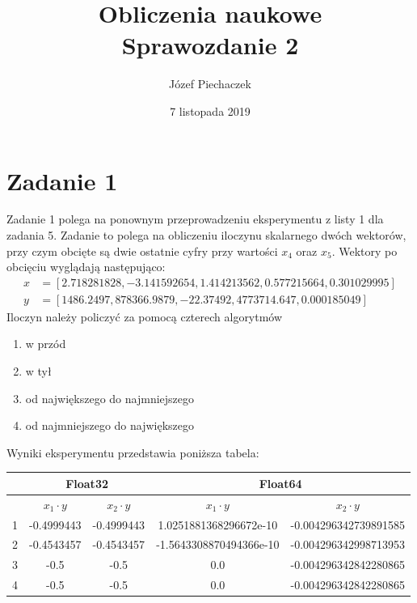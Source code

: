 \documentclass[12pt]{article}
\title{
	Obliczenia naukowe \\
	Sprawozdanie 2
}
\date{7 listopada 2019}
\author{Józef Piechaczek}
\begin{document}
\maketitle
\newpage
{}

\setlength{\abovedisplayskip}{5pt}
\setlength{\belowdisplayskip}{5pt}

\section{Zadanie 1}
Zadanie 1 polega na ponownym przeprowadzeniu eksperymentu z listy 1 dla zadania 5. Zadanie to polega na obliczeniu iloczynu skalarnego dwóch wektorów, przy czym obcięte są dwie ostatnie cyfry przy wartości $x_4$ oraz $x_5$. Wektory po obcięciu wyglądają następująco:
\begin{align*}
	x &= [2.718281828,-3.141592654,1.414213562,0.577215664,0.301029995] \\
	y &= [1486.2497,878366.9879,-22.37492,4773714.647,0.000185049]
\end{align*}
Iloczyn należy policzyć za pomocą czterech algorytmów
\begin{enumerate}
	\item w przód
	\item w tył
	\item od największego do najmniejszego
	\item od najmniejszego do największego
\end{enumerate}

Wyniki eksperymentu przedstawia poniższa tabela:
\begin{table}[h!]
	\small
	\centering
    \label{tab:table1}
    \begin{tabular}{|c|c|c|c|c|}
    		\hline
      	 & \multicolumn{2}{c|}{Float32} & \multicolumn{2}{c|}{Float64}\\
      	\hline
      	 & $x_1 \cdot y$ & $x_2 \cdot y$  & $x_1 \cdot y$ & $x_2 \cdot y$ \\
      	\hline
      	1 & -0.4999443 & -0.4999443 & 1.0251881368296672e-10 & -0.004296342739891585\\
		\hline
      	2 & -0.4543457 & -0.4543457 & -1.5643308870494366e-10 & -0.004296342998713953\\
		\hline
      	3 & -0.5 & -0.5 & 0.0 & -0.004296342842280865\\
		\hline
      	4 & -0.5 & -0.5 & 0.0 & -0.004296342842280865\\
		\hline
    \end{tabular}
\end{table}
\end{document}

